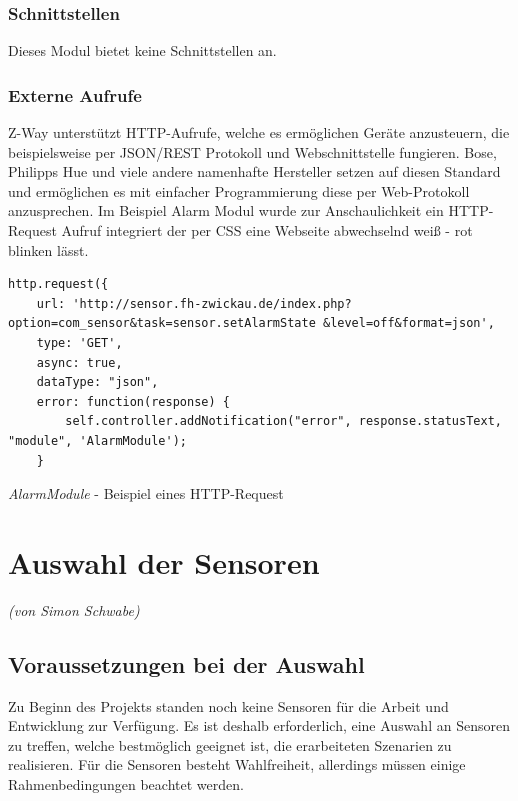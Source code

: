 \subsubsection{Schnittstellen}
Dieses Modul bietet keine Schnittstellen an.

\subsubsection{Externe Aufrufe}
Z-Way unterstützt HTTP-Aufrufe, welche es ermöglichen Geräte anzusteuern, die beispielsweise per JSON/REST Protokoll und Webschnittstelle fungieren. Bose, Philipps Hue und viele andere namenhafte Hersteller setzen auf diesen Standard und ermöglichen es mit einfacher Programmierung diese per Web-Protokoll anzusprechen. Im Beispiel Alarm Modul wurde zur Anschaulichkeit ein HTTP-Request Aufruf integriert der per CSS eine Webseite abwechselnd weiß - rot blinken lässt.

\begin{listing}
\begin{verbatim}
http.request({
	url: 'http://sensor.fh-zwickau.de/index.php?option=com_sensor&task=sensor.setAlarmState &level=off&format=json',
	type: 'GET',
	async: true,
	dataType: "json",
	error: function(response) {
		self.controller.addNotification("error", response.statusText, "module", 'AlarmModule');
	}
\end{verbatim}
\caption{\emph{AlarmModule} - Beispiel eines HTTP-Request}
\label{lst:alarmModuleHTTPRequest}
\end{listing}

\newpage
\section{Auswahl der Sensoren}
\label{sec:sensorAuswahl}
\emph{(von Simon Schwabe)}

\subsection{Voraussetzungen bei der Auswahl}
Zu Beginn des Projekts standen noch keine Sensoren für die Arbeit und Entwicklung zur Verfügung. Es ist deshalb erforderlich, eine Auswahl an Sensoren zu treffen, welche bestmöglich geeignet ist, die erarbeiteten Szenarien zu realisieren. Für die Sensoren besteht Wahlfreiheit, allerdings müssen einige Rahmenbedingungen beachtet werden.

